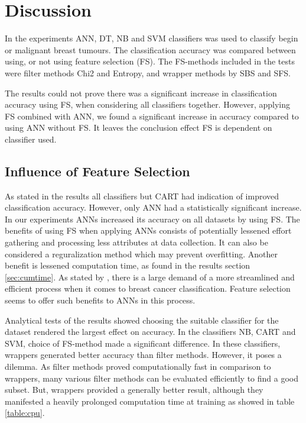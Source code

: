 \chapter{Discussion}

In the experiments ANN, DT, NB and SVM classifiers was used to classify begin or malignant breast tumours. The classification accuracy was compared between using, or not using feature selection (FS). The FS-methods included in the tests were filter methods Chi2 and Entropy, and wrapper methods by SBS and SFS.

The results could not prove there was a significant increase in classification accuracy using FS, when considering all classifiers together. However, applying FS combined with ANN, we found a significant increase in accuracy compared to using ANN without FS. It leaves the conclusion effect FS is dependent on classifier used.

\section{Influence of Feature Selection}

As stated in the results all classifiers but CART had indication of improved classification accuracy. However, only ANN had a statistically significant increase. In our experiments ANNs increased its accuracy on all datasets by using FS. The benefits of using FS when applying ANNs consists of potentially lessened effort gathering and processing less attributes at data collection. It can also be considered a reguralization method which may prevent overfitting. Another benefit is lessened computation time, as found in the results section \ref{sec:cumtime}. As stated by \textcite{martei2018}, there is a large demand of a more streamlined and efficient process when it comes to breast cancer classification. Feature selection seems to offer such benefits to ANNs in this process.

Analytical tests of the results showed choosing the suitable classifier for the dataset rendered the largest effect on accuracy. In the classifiers NB, CART and SVM, choice of FS-method made a significant difference. In these classifiers, wrappers generated better accuracy than filter methods. However, it poses a dilemma. As filter methods proved computationally fast in comparison to wrappers, many various filter methods can be evaluated efficiently to find a good subset. But, wrappers provided a generally better result, although they manifested a heavily prolonged computation time at training as showed in table \ref{table:cpu}.

